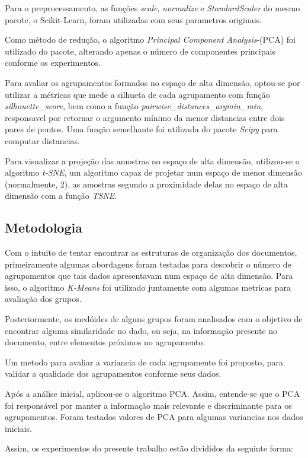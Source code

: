 \documentclass[conference]{IEEEtran}
\begin{document}
Para o preprocessamento, as funções \emph{scale}, \emph{normalize} e \emph{StandardScaler} do mesmo pacote, o Scikit-Learn, foram utilizadas com seus parametros originais.

Como método de redução, o algoritmo \emph{Principal Component Analysis}-(PCA) foi utilizado do pacote, alterando apenas o número de componentes principais conforme os experimentos.

Para avaliar os agrupamentos formados no espaço de alta dimensão, optou-se por utilizar a métricas que mede a silhueta de cada agrupamento com função \emph{silhouette\_score}, bem como a função \emph{pairwise\_distances\_argmin\_min}, responsavel por retornar o argumento mínimo da menor distancias entre dois pares de pontos. Uma função semelhante foi utilizada do pacote \emph{Scipy} para computar distancias.

Para visualizar a projeção das amostras no espaço de alta dimensão, utilizou-se o algoritmo \emph{t-SNE}, um algoritmo capaz de projetar num espaço de menor dimensão (normalmente, 2), as amostras segundo a proximidade delas no espaço de alta dimensão com a função \emph{TSNE}.


\subsection{Metodologia} \label{sec:met} 

Com o intuito de tentar encontrar as estruturas de organização dos documentos, primeiramente algumas abordagens foram testadas para descobrir o número de agrupamentos que tais dados apresentavam num espaço de alta dimensão. Para isso, o algoritmo \emph{K-Means} foi utilizado juntamente com algumas metricas para avaliação dos grupos.

Posteriormente, os medóides de alguns grupos foram analisados com o objetivo de encontrar alguma similaridade no dado, ou seja, na informação presente no documento, entre elementos próximos no agrupamento.

Um metodo para avaliar a variancia de cada agrupamento foi proposto, para validar a qualidade dos agrupamentos conforme seus dados.

Após a análise inicial, aplicou-se o algoritmo PCA. Assim, entende-se que o PCA foi responsável por manter a informação mais relevante e discriminante para os agrupamentos. Foram testados valores de PCA para algumas variancias nos dados iniciais.

Assim, os experimentos do presente trabalho estão divididos da seguinte forma: 
\end{document}
